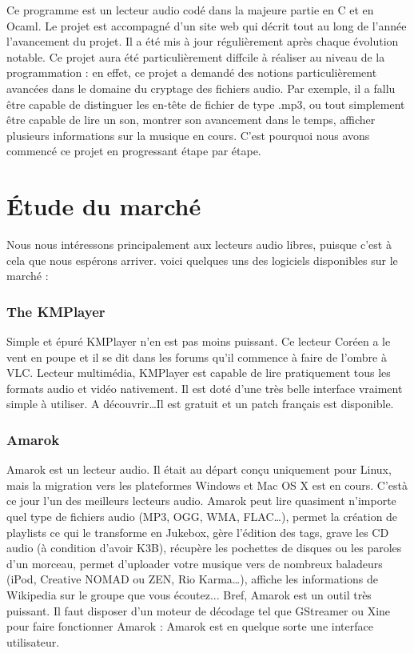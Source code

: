 \documentclass[12pt,a4paper]{report}
\begin{document}
Ce programme est un lecteur audio codé dans la majeure partie en C et en Ocaml. Le projet est accompagné d'un site web qui décrit tout au long de l'année l'avancement du projet. Il a été mis à jour régulièrement après chaque évolution notable. Ce projet aura été particulièrement diffcile à réaliser au niveau de la programmation : en effet, ce projet a demandé des notions particulièrement avancées dans le domaine du cryptage des fichiers audio. Par exemple, il a fallu être capable de distinguer les en-tête de fichier de type .mp3, ou tout simplement être capable de lire un son, montrer son avancement dans le temps, afficher plusieurs informations sur la musique en cours. C'est pourquoi nous avons commencé ce projet en progressant étape par étape.

\section{Étude du marché}
Nous nous intéressons principalement aux lecteurs audio libres, puisque c'est à cela que nous espérons arriver. voici quelques uns des logiciels disponibles sur le marché :

\subsubsection{The KMPlayer}

Simple et épuré KMPlayer n'en est pas moins puissant. Ce lecteur Coréen a le vent en poupe et il se dit dans les forums qu'il commence à faire de l'ombre à VLC. Lecteur multimédia, KMPlayer est capable de lire pratiquement tous les formats audio et vidéo nativement. Il est doté d'une très belle interface vraiment simple à  utiliser. A découvrir\ldots Il est gratuit et un patch français est disponible.

\subsubsection{Amarok}

Amarok est un lecteur audio. Il était au départ conçu uniquement pour Linux, mais la migration vers les plateformes Windows et Mac OS X est en cours. C'est\`a ce jour l'un des meilleurs lecteurs audio. 
Amarok peut lire quasiment n'importe quel type de fichiers audio (MP3, OGG, WMA, FLAC\ldots), permet la création de playlists ce qui le transforme en Jukebox, gère l'édition des tags, grave les CD audio (à condition d'avoir K3B), récupère les pochettes de disques ou les paroles d'un morceau, permet d'uploader votre musique vers de nombreux baladeurs (iPod, Creative NOMAD ou ZEN, Rio Karma\ldots), affiche les informations de Wikipedia sur le groupe que vous écoutez... Bref, Amarok est un outil très puissant.
Il faut disposer d'un moteur de décodage tel que GStreamer ou Xine pour faire fonctionner Amarok : Amarok est en quelque sorte une interface utilisateur. 
\end{document}

